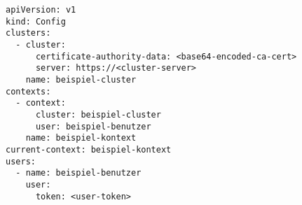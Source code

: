 \begin{verbatim}
apiVersion: v1
kind: Config
clusters:
  - cluster:
      certificate-authority-data: <base64-encoded-ca-cert>
      server: https://<cluster-server>
    name: beispiel-cluster
contexts:
  - context:
      cluster: beispiel-cluster
      user: beispiel-benutzer
    name: beispiel-kontext
current-context: beispiel-kontext
users:
  - name: beispiel-benutzer
    user:
      token: <user-token>
\end{verbatim}